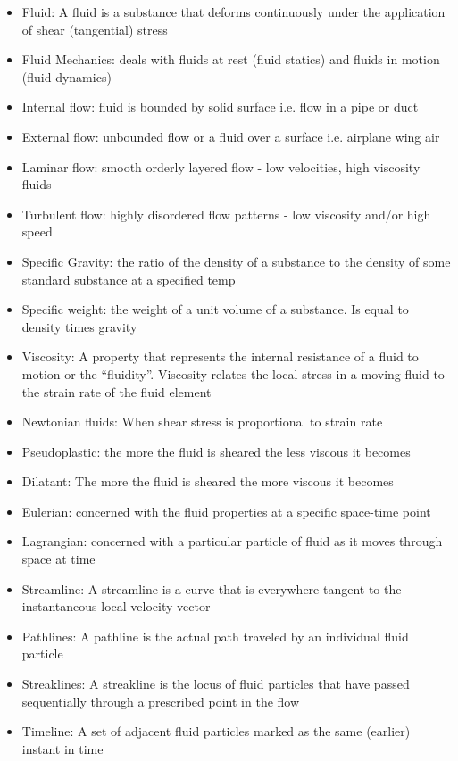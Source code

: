 \begin{itemize}
    \item Fluid: A fluid is a substance that deforms continuously under the application of shear (tangential) stress
    \item Fluid Mechanics: deals with fluids at rest (fluid statics) and fluids in motion (fluid dynamics)
    \item Internal flow: fluid is bounded by solid surface i.e. flow in a pipe or duct
    \item External flow: unbounded flow or a fluid over a surface i.e. airplane wing air
    \item Laminar flow: smooth orderly layered flow - low velocities, high viscosity fluids
    \item Turbulent flow: highly disordered flow patterns - low viscosity and/or high speed
    \item Specific Gravity: the ratio of the density of a substance to the density of some standard substance at a specified temp
    \item Specific weight: the weight of a unit volume of a substance. Is equal to density times gravity
    \item Viscosity: A property that represents the internal resistance of a fluid to motion or the “fluidity”. Viscosity relates the local stress in a moving fluid to the strain rate of the fluid element
    \item Newtonian fluids: When shear stress is proportional to strain rate
    \item Pseudoplastic: the more the fluid is sheared the less viscous it becomes
    \item Dilatant: The more the fluid is sheared the more viscous it becomes
    \item Eulerian: concerned with the fluid properties at a specific space-time point
    \item Lagrangian: concerned with a particular particle of fluid as it moves through space at time
    \item Streamline: A streamline is a curve that is everywhere tangent to the instantaneous local velocity vector
    \item Pathlines: A pathline is the actual path traveled by an individual fluid particle
    \item Streaklines: A streakline is the locus of fluid particles that have passed sequentially through a prescribed point in the flow
    \item Timeline: A set of adjacent fluid particles marked as the same (earlier) instant in time

\end{itemize}
